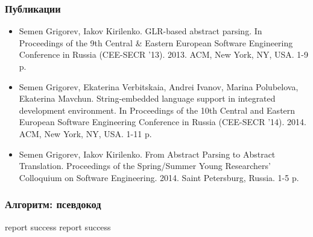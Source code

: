 \documentclass{beamer}
\begin{document}
\begin{frame}
    \transwipe[direction=90]
    \frametitle{Публикации}
  \begin{itemize}
          \item Semen Grigorev, Iakov Kirilenko. GLR-based abstract parsing. In Proceedings of the 9th Central \& Eastern European Software Engineering Conference in Russia (CEE-SECR ’13). 2013. ACM, New York, NY, USA. 1-9 p.
          \item Semen Grigorev, Ekaterina Verbitskaia, Andrei Ivanov, Marina Polubelova, Ekaterina Mavchun. String-embedded language support in integrated development environment. In Proceedings of the 10th Central and Eastern European Software Engineering Conference in Russia (CEE-SECR '14). 2014. ACM, New York, NY, USA. 1-11 p.
          \item Semen Grigorev, Iakov Kirilenko. From Abstract Parsing to Abstract Translation. Proceedings of the Spring/Summer Young Researchers' Colloquium on Software Engineering. 2014. Saint Petersburg, Russia. 1-5 p.
  \end{itemize} 
\end{frame}

\begin{frame}[fragile] 
    \transwipe[direction=90]
    \frametitle{Алгоритм: псевдокод}
\begin{algorithmic}[1]
     {report success}
    \EndIf
  \Else
    \EndWhile
     {report success}
    \EndIf
  \EndIf
\EndFunction
\end{algorithmic}
\end{frame}
\end{document}
